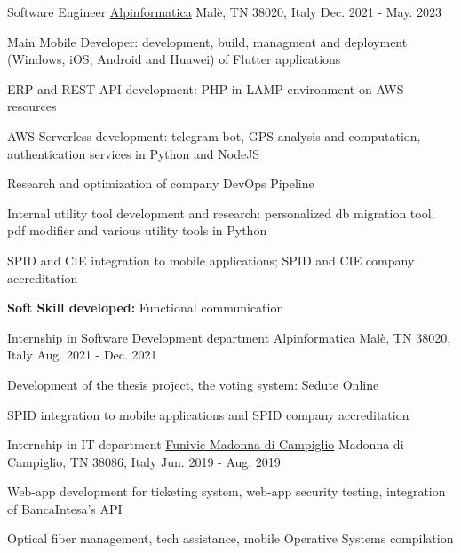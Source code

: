 \begin{cventries}
  \cventry
    {Software Engineer} %
    {\href{https://www.alpinformatica.com/}{Alpinformatica}} %
    {Malè, TN 38020, Italy} %
    {Dec. 2021 - May. 2023} %
    {
      \begin{cvitems} %
        \item {Main Mobile Developer: development, build, managment and deployment (Windows, iOS, Android and Huawei) of Flutter applications}
        \item {ERP and REST API development: PHP in LAMP environment on AWS resources}
        \item {AWS Serverless development: telegram bot, GPS analysis and computation, authentication services in Python and NodeJS}
        \item {Research and optimization of company DevOps Pipeline}
        \item {Internal utility tool development and research: personalized db migration tool, pdf modifier and various utility tools in Python}
        \item {SPID and CIE integration to mobile applications; SPID and CIE company accreditation}
        \item {\textbf{Soft Skill developed:} Functional communication}
      \end{cvitems}
    }

  \cventry
    {Internship in Software Development department} %
    {\href{https://www.alpinformatica.com/}{Alpinformatica}} %
    {Malè, TN 38020, Italy} %
    {Aug. 2021 - Dec. 2021} %
    {
      \begin{cvitems} %
        \item {Development of the thesis project, the voting system: Sedute Online}
        \item {SPID integration to mobile applications and SPID company accreditation}
      \end{cvitems}
    }
\cventry
{Internship in IT department} %
{\href{https://www.funiviecampiglio.it}{Funivie Madonna di Campiglio}} %
{Madonna di Campiglio, TN 38086, Italy} %
{Jun. 2019 - Aug. 2019} %
{
  \begin{cvitems} %
    \item {Web-app development for ticketing system, web-app security testing, integration of BancaIntesa's API}
    \item {Optical fiber management, tech assistance, mobile Operative Systems compilation}
  \end{cvitems}
  }


\end{cventries}
